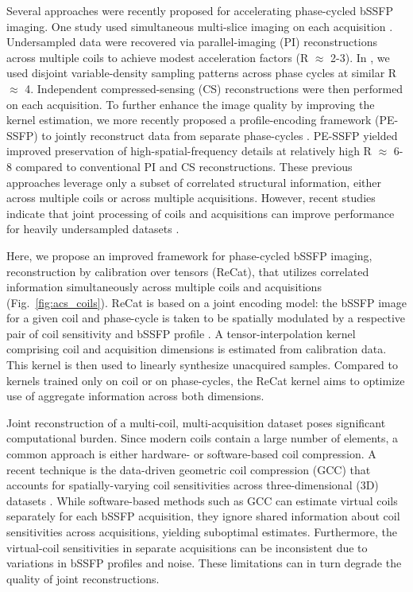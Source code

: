 \documentclass[11pt, onecolumn]{article}
\begin{document}
Several approaches were recently proposed for accelerating phase-cycled bSSFP imaging. One study used simultaneous multi-slice imaging on each acquisition \cite{Wang:2015hh}. Undersampled data were recovered via parallel-imaging (PI) reconstructions \cite{PruessmannSENSE,GriswoldGRAPPA} across multiple coils to achieve modest acceleration factors (R $\approx$ 2-3). In \cite{Cukur:2015ic}, we used disjoint variable-density sampling patterns across phase cycles at similar R $\approx$ 4. Independent compressed-sensing (CS) reconstructions \cite{Block,MikiCS,CSENS} were then performed on each acquisition. To further enhance the image quality by improving the kernel estimation, we more recently proposed a profile-encoding framework (PE-SSFP) to jointly reconstruct data from separate phase-cycles \cite{Ilicak:FJpKoYYb}. PE-SSFP yielded improved preservation of high-spatial-frequency details at relatively high R $\approx$ 6-8 compared to conventional PI and CS reconstructions. These previous approaches leverage only a subset of correlated structural information, either across multiple coils or across multiple acquisitions. However, recent studies indicate that joint processing of coils and acquisitions can improve performance for heavily undersampled datasets \cite{Majumdar:2011hj,Bilgic:2011jv,Jin:2016cz}.

Here, we propose an improved framework for phase-cycled bSSFP imaging, reconstruction by calibration over tensors (ReCat), that utilizes correlated information simultaneously across multiple coils and acquisitions (Fig.~\ref{fig:acs_coils}). ReCat is based on a joint encoding model: the bSSFP image for a given coil and phase-cycle is taken to be spatially modulated by a respective pair of coil sensitivity \cite{PruessmannSENSE, Lustig:2010hs} and bSSFP profile \cite{mikisFOV,Ilicak:FJpKoYYb}. A tensor-interpolation kernel comprising coil and acquisition dimensions is estimated from calibration data. This kernel is then used to linearly synthesize unacquired samples. Compared to kernels trained only on coil or on phase-cycles, the ReCat kernel aims to optimize use of aggregate information across both dimensions. 

Joint reconstruction of a multi-coil, multi-acquisition dataset poses significant computational burden. Since modern coils contain a large number of elements, a common approach is either hardware- \cite{king2010optimum} or software-based \cite{buehrer2007array,huang2008software} coil compression. A recent technique is the data-driven geometric coil compression (GCC) that accounts for spatially-varying coil sensitivities across three-dimensional (3D) datasets \cite{Zhang:2013df}. While software-based methods such as GCC can estimate virtual coils separately for each bSSFP acquisition, they ignore shared information about coil sensitivities across acquisitions, yielding suboptimal estimates. Furthermore, the virtual-coil sensitivities in separate acquisitions can be inconsistent due to variations in bSSFP profiles and noise. These limitations can in turn degrade the quality of joint reconstructions. 
\end{document}
